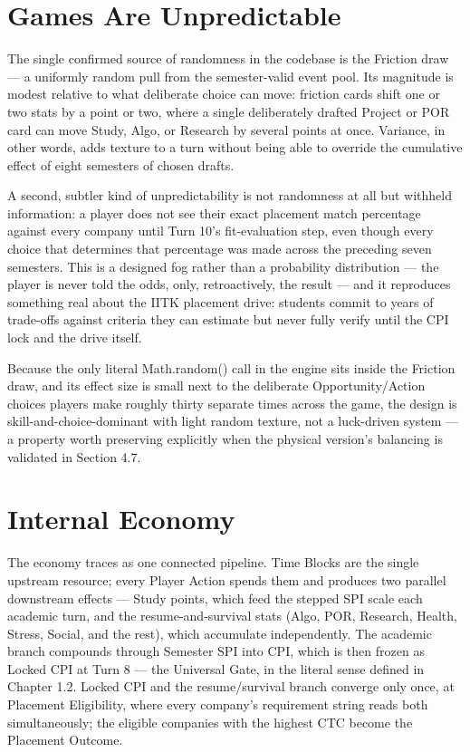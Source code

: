 \section{Games Are Unpredictable}

The single confirmed source of randomness in the codebase is the Friction draw --- a uniformly random pull from the semester-valid event pool. Its magnitude is modest relative to what deliberate choice can move: friction cards shift one or two stats by a point or two, where a single deliberately drafted Project or POR card can move Study, Algo, or Research by several points at once. Variance, in other words, adds texture to a turn without being able to override the cumulative effect of eight semesters of chosen drafts.

A second, subtler kind of unpredictability is not randomness at all but withheld information: a player does not see their exact placement match percentage against every company until Turn 10's fit-evaluation step, even though every choice that determines that percentage was made across the preceding seven semesters. This is a designed fog rather than a probability distribution --- the player is never told the odds, only, retroactively, the result --- and it reproduces something real about the IITK placement drive: students commit to years of trade-offs against criteria they can estimate but never fully verify until the CPI lock and the drive itself.

Because the only literal Math.random() call in the engine sits inside the Friction draw, and its effect size is small next to the deliberate Opportunity/Action choices players make roughly thirty separate times across the game, the design is skill-and-choice-dominant with light random texture, not a luck-driven system --- a property worth preserving explicitly when the physical version's balancing is validated in Section 4.7.

\section{Internal Economy}

The economy traces as one connected pipeline. Time Blocks are the single upstream resource; every Player Action spends them and produces two parallel downstream effects --- Study points, which feed the stepped SPI scale each academic turn, and the resume-and-survival stats (Algo, POR, Research, Health, Stress, Social, and the rest), which accumulate independently. The academic branch compounds through Semester SPI into CPI, which is then frozen as Locked CPI at Turn 8 --- the Universal Gate, in the literal sense defined in Chapter 1.2. Locked CPI and the resume/survival branch converge only once, at Placement Eligibility, where every company's requirement string reads both simultaneously; the eligible companies with the highest CTC become the Placement Outcome.

